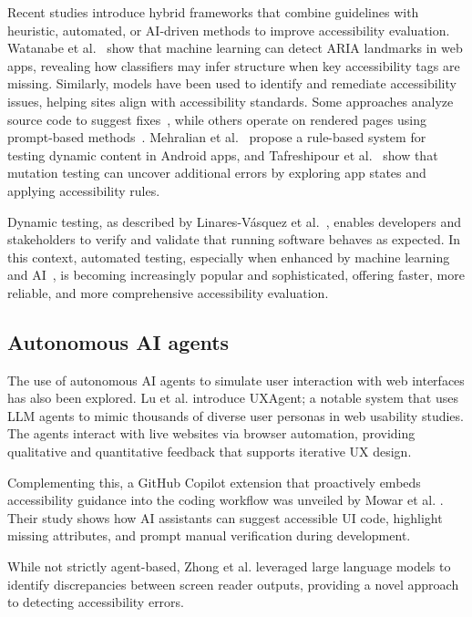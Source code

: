 Recent studies introduce hybrid frameworks that combine guidelines with heuristic, automated, or AI-driven methods to improve accessibility evaluation. Watanabe et al.~\cite{watanabe2024accessibility} show that machine learning can detect ARIA landmarks in web apps, revealing how classifiers may infer structure when key accessibility tags are missing. Similarly, models have been used to identify and remediate accessibility issues, helping sites align with accessibility standards. Some approaches analyze source code to suggest fixes~\cite{ramineni2024leveraging, kuszczynski2023comparative}, while others operate on rendered pages using prompt-based methods~\cite{he2025enhancing}. Mehralian et al.~\cite{mehralian2025automated} propose a rule-based system for testing dynamic content in Android apps, and Tafreshipour et al.~\cite{tafreshipour2024ma11y} show that mutation testing can uncover additional errors by exploring app states and applying accessibility rules. 

Dynamic testing, as described by Linares-Vásquez et al.~\cite{vasquez2018continuous}, enables developers and stakeholders to verify and validate that running software behaves as expected. In this context, automated testing, especially when enhanced by machine learning and \ac{AI}~\cite{lanham2025ai, wang2024survey, lu2025uxagent}, is becoming increasingly popular and sophisticated, offering faster, more reliable, and more comprehensive accessibility evaluation. 

\subsection{Autonomous AI agents}

The use of autonomous \ac{AI} agents to simulate user interaction with web interfaces has also been explored. Lu et al. \cite{lu2025uxagent} introduce UXAgent; a notable system that uses LLM agents to mimic thousands of diverse user personas in web usability studies. The agents interact with live websites via browser automation, providing qualitative and quantitative feedback that supports iterative UX design. 

Complementing this, a GitHub Copilot extension that proactively embeds accessibility guidance into the coding workflow was unveiled by Mowar et al. \cite{mowar2025codea11y}. Their study shows how \ac{AI} assistants can suggest accessible \ac{UI} code, highlight missing attributes, and prompt manual verification during development.

While not strictly agent-based, Zhong et al. \cite{zhong2025screenaudit} leveraged large language models to identify discrepancies between screen reader outputs, providing a novel approach to detecting accessibility errors.

